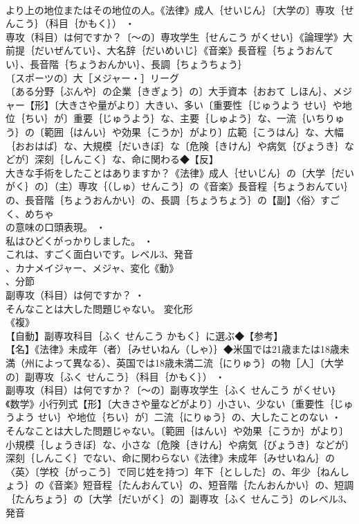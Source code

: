 \documentclass[8pt]{extreport}
\begin{document}
\begin{CJK}{UTF8}{min}
\\	より上の地位またはその地位の人。《法律》成人｛せいじん｝〔大学の〕専攻｛せんこう｝（科目｛かもく｝） ・
\\	専攻（科目）は何ですか？〔～の〕専攻学生｛せんこう がくせい｝《論理学》大前提｛だいぜんてい｝、大名辞｛だいめいじ｝《音楽》長音程｛ちょうおんてい｝、長音階｛ちょうおんかい｝、長調｛ちょうちょう｝
\\	〔スポーツの〕大［メジャー・］リーグ
\\	〔ある分野｛ぶんや｝の企業｛きぎょう｝の〕大手資本｛おおて しほん｝、メジャー【形】〔大きさや量がより〕大きい、多い〔重要性｛じゅうよう せい｝や地位｛ちい｝が〕重要｛じゅうよう｝な、主要｛しゅよう｝な、一流｛いちりゅう｝の〔範囲｛はんい｝や効果｛こうか｝がより〕広範｛こうはん｝な、大幅｛おおはば｝な、大規模｛だいきぼ｝な〔危険｛きけん｝や病気｛びょうき｝などが〕深刻｛しんこく｝な、命に関わる◆【反】
\\	大きな手術をしたことはありますか？《法律》成人｛せいじん｝の〔大学｛だいがく｝の〕（主）専攻｛（しゅ）せんこう｝の《音楽》長音程｛ちょうおんてい｝の、長音階｛ちょうおんかい｝の、長調｛ちょうちょう｝の【副】〈俗〉すごく、めちゃ
\\	の意味の口頭表現。 ・
\\	私はひどくがっかりしました。 ・
\\	これは、すごく面白いです。レベル3、発音
\\	、カナメイジャー、メジャ、変化《動》
\\	、分節
\\	副専攻（科目）は何ですか？ ・
\\	そんなことは大した問題じゃない。	変化形 
\\	《複》
\\	【自動】副専攻科目｛ふく せんこう かもく｝に選ぶ◆【参考】
\\	【名】《法律》未成年（者）｛みせいねん（しゃ）｝◆米国では21歳または18歳未満（州によって異なる）、英国では18歳未満二流｛にりゅう｝の物［人］〔大学の〕副専攻｛ふく せんこう｝（科目｛かもく｝） ・
\\	副専攻（科目）は何ですか？〔～の〕副専攻学生｛ふく せんこう がくせい｝《数学》小行列式【形】〔大きさや量などがより〕小さい、少ない〔重要性｛じゅうよう せい｝や地位｛ちい｝が〕二流｛にりゅう｝の、大したことのない ・
\\	そんなことは大した問題じゃない。〔範囲｛はんい｝や効果｛こうか｝がより〕小規模｛しょうきぼ｝な、小さな〔危険｛きけん｝や病気｛びょうき｝などが〕深刻｛しんこく｝でない、命に関わらない《法律》未成年｛みせいねん｝の〈英〉〔学校｛がっこう｝で同じ姓を持つ〕年下｛としした｝の、年少｛ねんしょう｝の《音楽》短音程｛たんおんてい｝の、短音階｛たんおんかい｝の、短調｛たんちょう｝の〔大学｛だいがく｝の〕副専攻｛ふく せんこう｝のレベル3、発音

\end{CJK}
\end{document}

